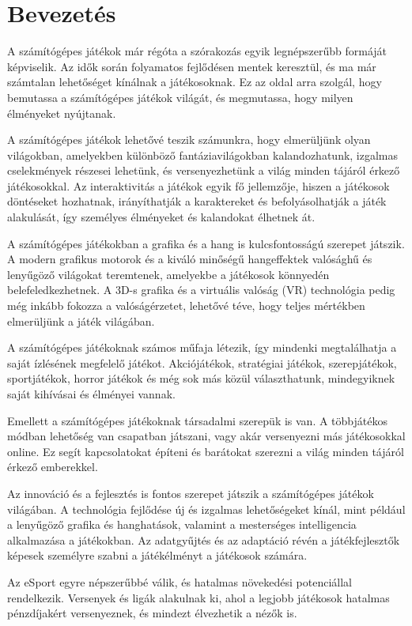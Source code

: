 \chapter{Bevezetés}

A számítógépes játékok már régóta a szórakozás egyik legnépszerűbb formáját képviselik. Az idők során folyamatos fejlődésen mentek keresztül, és ma már számtalan lehetőséget kínálnak a játékosoknak. Ez az oldal arra szolgál, hogy bemutassa a számítógépes játékok világát, és megmutassa, hogy milyen élményeket nyújtanak.

A számítógépes játékok lehetővé teszik számunkra, hogy elmerüljünk olyan világokban, amelyekben különböző fantáziavilágokban kalandozhatunk, izgalmas cselekmények részesei lehetünk, és versenyezhetünk a világ minden tájáról érkező játékosokkal. Az interaktivitás a játékok egyik fő jellemzője, hiszen a játékosok döntéseket hozhatnak, irányíthatják a karaktereket és befolyásolhatják a játék alakulását, így személyes élményeket és kalandokat élhetnek át.

A számítógépes játékokban a grafika és a hang is kulcsfontosságú szerepet játszik. A modern grafikus motorok és a kiváló minőségű hangeffektek valósághű és lenyűgöző világokat teremtenek, amelyekbe a játékosok könnyedén belefeledkezhetnek. A 3D-s grafika és a virtuális valóság (VR) technológia pedig még inkább fokozza a valóságérzetet, lehetővé téve, hogy teljes mértékben elmerüljünk a játék világában.

A számítógépes játékoknak számos műfaja létezik, így mindenki megtalálhatja a saját ízlésének megfelelő játékot. Akciójátékok, stratégiai játékok, szerepjátékok, sportjátékok, horror játékok és még sok más közül választhatunk, mindegyiknek saját kihívásai és élményei vannak.

Emellett a számítógépes játékoknak társadalmi szerepük is van. A többjátékos módban lehetőség van csapatban játszani, vagy akár versenyezni más játékosokkal online. Ez segít kapcsolatokat építeni és barátokat szerezni a világ minden tájáról érkező emberekkel.

Az innováció és a fejlesztés is fontos szerepet játszik a számítógépes játékok világában. A technológia fejlődése új és izgalmas lehetőségeket kínál, mint például a lenyűgöző grafika és hanghatások, valamint a mesterséges intelligencia alkalmazása a játékokban. Az adatgyűjtés és az adaptáció révén a játékfejlesztők képesek személyre szabni a játékélményt a játékosok számára.

Az eSport egyre népszerűbbé válik, és hatalmas növekedési potenciállal rendelkezik. Versenyek és ligák alakulnak ki, ahol a legjobb játékosok hatalmas pénzdíjakért versenyeznek, és mindezt élvezhetik a nézők is.

